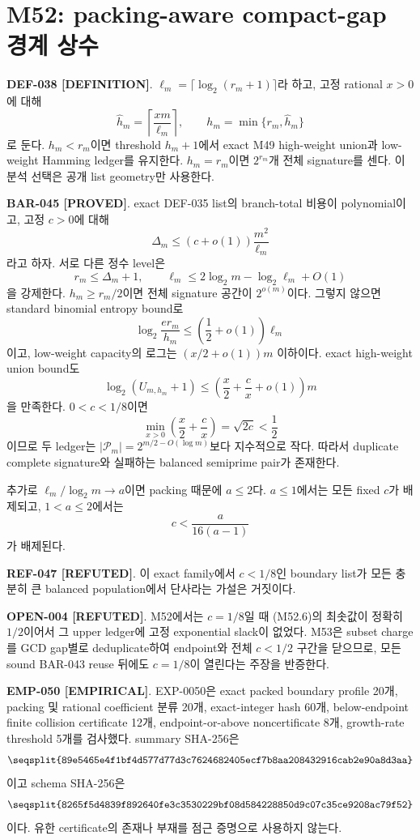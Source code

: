 \documentclass[11pt]{article}
\newcommand{\claimstatus}[2]{\textbf{#1 [#2]}}
\begin{document}
\section{M52: packing-aware compact-gap 경계 상수}

\claimstatus{DEF-038}{DEFINITION}.
\(\ell_m=\lceil\log_2(r_m+1)\rceil\)라 하고, 고정 rational \(x>0\)에
대해
\[
\widehat h_m=\left\lceil\frac{x m}{\ell_m}\right\rceil,\qquad
h_m=\min\{r_m,\widehat h_m\}
\tag{M52.1}
\]
로 둔다. \(h_m<r_m\)이면 threshold \(h_m+1\)에서 exact M49
high-weight union과 low-weight Hamming ledger를 유지한다.
\(h_m=r_m\)이면 \(2^{r_m}\)개 전체 signature를 센다. 이 분석 선택은
공개 list geometry만 사용한다.

\claimstatus{BAR-045}{PROVED}.
exact DEF-035 list의 branch-total 비용이 polynomial이고, 고정
\(c>0\)에 대해
\[
\Delta_m\le(c+o(1))\frac{m^2}{\ell_m}
\tag{M52.2}
\]
라고 하자. 서로 다른 정수 level은
\[
r_m\le\Delta_m+1,\qquad
\ell_m\le2\log_2m-\log_2\ell_m+O(1)
\tag{M52.3}
\]
을 강제한다. \(h_m\ge r_m/2\)이면 전체 signature 공간이
\(2^{o(m)}\)이다. 그렇지 않으면 standard binomial entropy bound로
\[
\log_2\frac{e r_m}{h_m}
\le\left(\frac12+o(1)\right)\ell_m
\tag{M52.4}
\]
이고, low-weight capacity의 로그는 \((x/2+o(1))m\) 이하이다.
exact high-weight union bound도
\[
\log_2(U_{m,h_m}+1)
\le\left(\frac{x}{2}+\frac{c}{x}+o(1)\right)m
\tag{M52.5}
\]
을 만족한다. \(0<c<1/8\)이면
\[
\min_{x>0}\left(\frac{x}{2}+\frac{c}{x}\right)
=\sqrt{2c}<\frac12
\tag{M52.6}
\]
이므로 두 ledger는
\(|\mathcal P_m|=2^{m/2-O(\log m)}\)보다 지수적으로 작다. 따라서
duplicate complete signature와 실패하는 balanced semiprime pair가
존재한다.

추가로 \(\ell_m/\log_2m\to a\)이면 packing 때문에 \(a\le2\)다.
\(a\le1\)에서는 모든 fixed \(c\)가 배제되고, \(1<a\le2\)에서는
\[
c<\frac{a}{16(a-1)}
\tag{M52.7}
\]
가 배제된다.

\claimstatus{REF-047}{REFUTED}.
이 exact family에서 \(c<1/8\)인 boundary list가 모든 충분히 큰
balanced population에서 단사라는 가설은 거짓이다.

\claimstatus{OPEN-004}{REFUTED}.
M52에서는 \(c=1/8\)일 때 (M52.6)의 최솟값이 정확히 \(1/2\)이어서
그 upper ledger에 고정 exponential slack이 없었다. M53은 subset
charge를 GCD gap별로 deduplicate하여 endpoint와 전체 \(c<1/2\)
구간을 닫으므로, 모든 sound BAR-043 reuse 뒤에도 \(c=1/8\)이 열린다는
주장을 반증한다.

\claimstatus{EMP-050}{EMPIRICAL}.
EXP-0050은 exact packed boundary profile 20개, packing 및 rational
coefficient 분류 20개, exact-integer hash 60개, below-endpoint finite
collision certificate 12개, endpoint-or-above noncertificate 8개,
growth-rate threshold 5개를 검사했다. summary SHA-256은
\[
\texttt{\seqsplit{89e5465e4f1bf4d577d77d3c7624682405ecf7b8aa208432916cab2e90a8d3aa}}
\]
이고 schema SHA-256은
\[
\texttt{\seqsplit{8265f5d4839f892640fe3c3530229bf08d584228850d9c07c35ce9208ac79f52}}
\]
이다. 유한 certificate의 존재나 부재를 점근 증명으로 사용하지 않는다.
\end{document}
